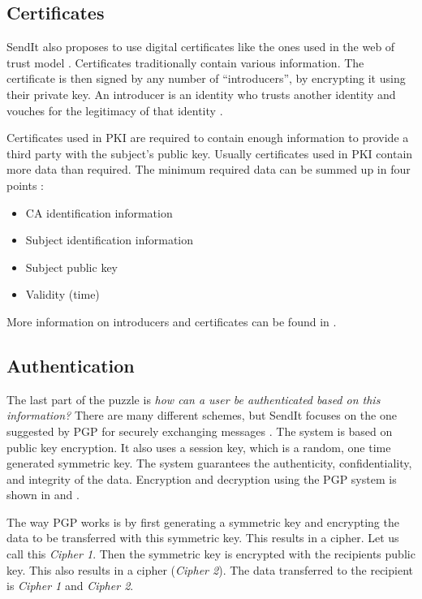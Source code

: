     \subsection{Certificates}
    \label{sec:cert}
    SendIt also proposes to use digital certificates like the ones used in the web of trust model \cite{ar_pgp}. Certificates traditionally contain various information. The certificate is then signed by any number of “introducers”, by encrypting it using their private key. An introducer is an identity who trusts another identity and vouches for the legitimacy of that identity \cite{ar_pgp}.
    
    Certificates used in PKI are required to contain enough information to provide a third party with the subject's public key. Usually certificates used in PKI contain more data than required. The minimum required data can be summed up in four points \cite{vaccaPublicKeyInfrastructure2004}:\\
    \begin{itemize}
        \item CA identification information
        \item Subject identification information
        \item Subject public key
        \item Validity (time)
    \end{itemize}
    More information on introducers and certificates can be found in .

    \subsection{Authentication}
    \label{sec:pgp_enc}
    The last part of the puzzle is \emph{how can a user be authenticated based on this information?} There are many different schemes, but SendIt focuses on the one suggested by PGP for securely exchanging messages \cite{b_pgp}. The system is based on public key encryption. It also uses a session key, which is a random, one time generated symmetric key. The system guarantees the authenticity, confidentiality, and integrity of the data. Encryption and decryption using the PGP system is shown in  and .

    The way PGP works is by first generating a symmetric key and encrypting the data to be transferred with this symmetric key. This results in a cipher. Let us call this \emph{Cipher 1}. Then the symmetric key is encrypted with the recipients public key. This also results in a cipher (\emph{Cipher 2}). The data transferred to the recipient is \emph{Cipher 1} and \emph{Cipher 2}.

